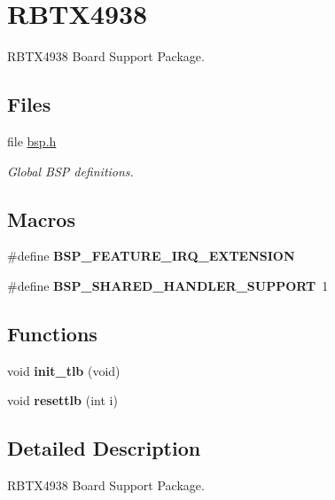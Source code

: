 \hypertarget{group__RTEMSBSPsMIPSRBTX4938}{}\section{R\+B\+T\+X4938}
\label{group__RTEMSBSPsMIPSRBTX4938}


R\+B\+T\+X4938 Board Support Package.  


\subsection*{Files}
\begin{DoxyCompactItemize}
\item 
file \mbox{\hyperlink{bsps_2mips_2rbtx4938_2include_2bsp_8h}{bsp.\+h}}
\begin{DoxyCompactList}\small\item\em Global B\+SP definitions. \end{DoxyCompactList}\end{DoxyCompactItemize}
\subsection*{Macros}
\begin{DoxyCompactItemize}
\item 
\mbox{\label{group__RTEMSBSPsMIPSRBTX4938_ga5d7d631d3a14b7554160f14eb42f351b}} 
\#define {\bfseries B\+S\+P\+\_\+\+F\+E\+A\+T\+U\+R\+E\+\_\+\+I\+R\+Q\+\_\+\+E\+X\+T\+E\+N\+S\+I\+ON}
\item 
\mbox{\label{group__RTEMSBSPsMIPSRBTX4938_ga2fe5e739729e5756a04cc73da64cc8ee}} 
\#define {\bfseries B\+S\+P\+\_\+\+S\+H\+A\+R\+E\+D\+\_\+\+H\+A\+N\+D\+L\+E\+R\+\_\+\+S\+U\+P\+P\+O\+RT}~1
\end{DoxyCompactItemize}
\subsection*{Functions}
\begin{DoxyCompactItemize}
\item 
\mbox{\label{group__RTEMSBSPsMIPSRBTX4938_gacb3eb371c98c83f4058d92f3e0bb74a8}} 
void {\bfseries init\+\_\+tlb} (void)
\item 
\mbox{\label{group__RTEMSBSPsMIPSRBTX4938_ga5aac3896e936d66009fe668385795a58}} 
void {\bfseries resettlb} (int i)
\end{DoxyCompactItemize}


\subsection{Detailed Description}
R\+B\+T\+X4938 Board Support Package. 

